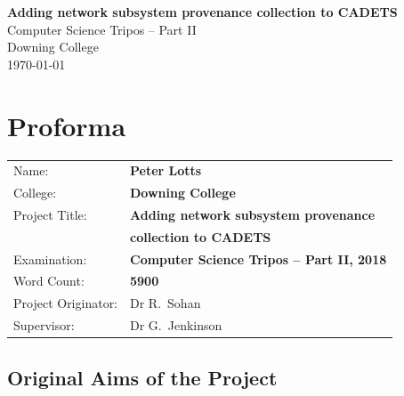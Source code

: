 \documentclass[a4paper,12pt,twoside,openright]{report}
\begin{document}
	
	
	
	\pagestyle{empty}
	
	
	\vspace*{60mm}
	\begin{center}
		\Huge
		\textbf{Adding network subsystem provenance collection to CADETS} \\[5mm]
		Computer Science Tripos -- Part II \\[5mm]
		Downing College \\[5mm]
		\today  %
	\end{center}
	
	
	\pagestyle{plain}
	
	\chapter*{Proforma}
	
	{\large
		\begin{tabular}{ll}
			Name:               & \bf Peter Lotts                       \\
			College:            & \bf Downing College                     \\
			Project Title:      & \bf Adding network subsystem provenance \\
								& \bf collection to CADETS \\
			Examination:        & \bf Computer Science Tripos -- Part II, 2018  \\
			Word Count:         & \bf 5900\footnotemark[1]  \\
			Project Originator: & Dr R.~Sohan                    \\
			Supervisor:         & Dr G.~Jenkinson                    \\ 
		\end{tabular}
	}
	
	
	\section*{Original Aims of the Project}
	
\end{document}
